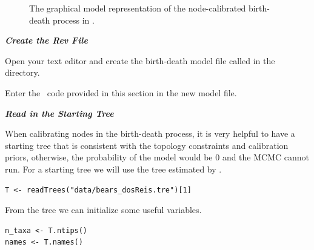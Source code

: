 \begin{figure}[h!]
\centering
{}
\caption{\small The graphical model representation of the node-calibrated birth-death process in \RevBayes.}
\label{m_BDCal:fig}
\end{figure}

\textbf{\textit{Create the Rev File}}

{\begin{framed}
Open your text editor and create the birth-death model file called {\textcolor{red}{}} in the  directory.

Enter the \Rev~code provided in this section in the new model file.
\end{framed}}


\textbf{\textit{Read in the Starting Tree}}

When calibrating nodes in the birth-death process, it is very helpful to have a starting tree that is consistent with the topology constraints and calibration priors, otherwise, the probability of the model would be 0 and the MCMC cannot run.
For a starting tree we will use the tree estimated by \citet{dosReis2012}. 
{\tt \begin{snugshade*}
\begin{lstlisting}
T <- readTrees("data/bears_dosReis.tre")[1]
\end{lstlisting}
\end{snugshade*}}

From the tree we can initialize some useful variables.
{\tt \begin{snugshade*}
\begin{lstlisting}
n_taxa <- T.ntips()
names <- T.names()
\end{lstlisting}
\end{snugshade*}}


